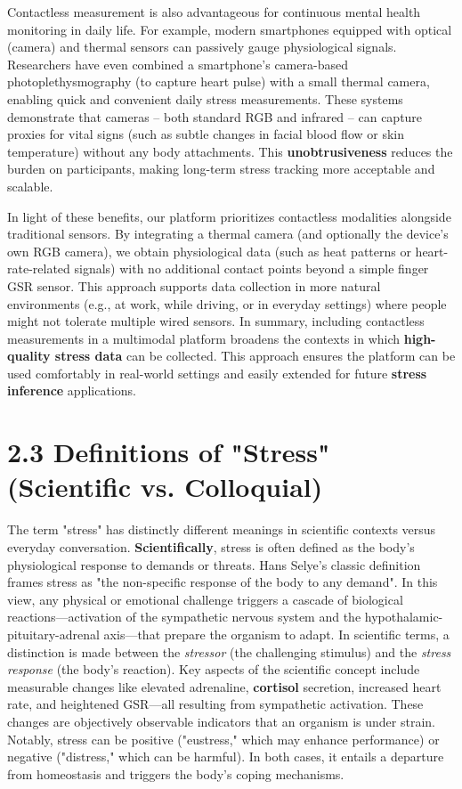 \documentclass[11pt,a4paper]{report}
\begin{document}
Contactless measurement is also advantageous for continuous mental health monitoring in daily life. For example, modern smartphones equipped with optical (camera) and thermal sensors can passively gauge physiological signals. Researchers have even combined a smartphone's camera-based photoplethysmography (to capture heart pulse) with a small thermal camera, enabling quick and convenient daily stress measurements\cite{GSRFacialThermal2021}. These systems demonstrate that cameras – both standard RGB and infrared – can capture proxies for vital signs (such as subtle changes in facial blood flow or skin temperature) without any body attachments. This \textbf{unobtrusiveness} reduces the burden on participants, making long-term stress tracking more acceptable and scalable.

In light of these benefits, our platform prioritizes contactless modalities alongside traditional sensors. By integrating a thermal camera (and optionally the device's own RGB camera), we obtain physiological data (such as heat patterns or heart-rate-related signals) with no additional contact points beyond a simple finger GSR sensor. This approach supports data collection in more natural environments (e.g., at work, while driving, or in everyday settings) where people might not tolerate multiple wired sensors. In summary, including contactless measurements in a multimodal platform broadens the contexts in which \textbf{high-quality stress data} can be collected. This approach ensures the platform can be used comfortably in real-world settings and easily extended for future \textbf{stress inference} applications.

\section{2.3 Definitions of "Stress" (Scientific vs. Colloquial)}

The term "stress" has distinctly different meanings in scientific contexts versus everyday conversation. \textbf{Scientifically}, stress is often defined as the body's physiological response to demands or threats. Hans Selye's classic definition frames stress as "the non-specific response of the body to any demand"\cite{StressDefinitionHH}. In this view, any physical or emotional challenge triggers a cascade of biological reactions—activation of the sympathetic nervous system and the hypothalamic-pituitary-adrenal axis—that prepare the organism to adapt. In scientific terms, a distinction is made between the \textit{stressor} (the challenging stimulus) and the \textit{stress response} (the body's reaction). Key aspects of the scientific concept include measurable changes like elevated adrenaline, \textbf{cortisol} secretion, increased heart rate, and heightened GSR—all resulting from sympathetic activation\cite{CortisolStressIndicator2020}. These changes are objectively observable indicators that an organism is under strain. Notably, stress can be positive ("eustress," which may enhance performance) or negative ("distress," which can be harmful). In both cases, it entails a departure from homeostasis and triggers the body's coping mechanisms.
\end{document}
